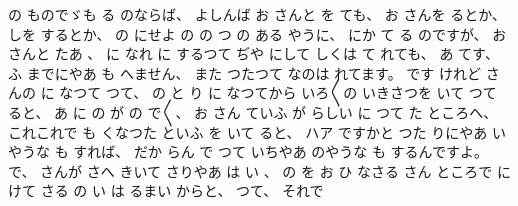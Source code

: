 の
ものでゞも
る
のならば、
%
よしんば
お
さんと
を
ても、
%
お
さんを
るとか、
%
しを
するとか、
%
の
にせよ
の
%
の
つ
の
ある
やうに、
%
にか
て
る
のですが、
%
お
さんと
たあ
、
%
に
なれ
に
するつて
ぢや
にして
しくは
て
れても、
%
あ
てす、
%
ふ
までにやあ
も
へません、
%
また
つたつて
なのは
れてます。
%
です
けれど
さんの
に
なつて
つて、
%
の
と
り
に
なつてから
いろ〳〵の
いきさつを
いて
つて
ると、
%
あ
に
の
が
の
で〳〵、
%
お
さん
ていふ
が
%
らしい
に
つて
た
ところへ、
%
これこれで%
も
くなつた
といふ
を
いて
ると、
ハア
ですかと
つた
りにやあ
いやうな
も
すれば、
%
だか
らん
で
つて
いちやあ
のやうな
も
するんですよ。
%
で、
%
さんが
さへ
きいて
さりやあ
は
い
、
%
の
を
お
ひ
なさる
さん
ところで
に
けて
さる
の
い
は
るまい
%
からと、
%
つて、
%
それで
